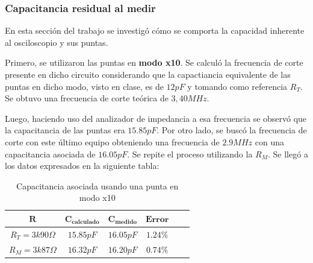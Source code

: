 \documentclass[11pt, a4paper]{article}
\begin{document}
\subsubsection*{Capacitancia residual al medir}

En esta sección del trabajo se investigó cómo se comporta la capacidad inherente al osciloscopio y sus puntas. 

Primero, se utilizaron las puntas en \textbf{modo x10}. Se calculó la frecuencia de corte presente en dicho circuito considerando que la capactiancia equivalente de las puntas en dicho modo, visto en clase, es de $12 pF$ y tomando como referencia $R_T$. Se obtuvo una frecuencia de corte teórica de $3,40MHz$. \par 
Luego, haciendo uso del analizador de impedancia a esa frecuencia se observó que la capacitancia de las puntas era $15.85 pF$. Por otro lado, se buscó la frecuencia de corte con este último equipo obteniendo una frecuencia de $2.9 MHz$ con una capacitancia asociada de $16.05pF$. Se repite el proceso utilizando la $R_M$. Se llegó a los datos expresados en la siguiente tabla:
 \begin{center}
     \begin{table}[ht]
     \centering
	 \renewcommand{\arraystretch}{1.1}
         \begin{tabular}{c c c c c c}
            \hline 
             $\bm{R}$ &  $\bm{C_{calculado}}$ &    $\bm{C_{medido}}$   &  $\bm{Error}$\\ \hline
             $R_T = 3k90\Omega$  & $15.85 pF$ & $16.05 pF$ & $1.24\%$ \\  
             $R_M = 3k87\Omega$ & $16.32 pF$ & $16.20 pF$ & $0.74 \%$ \\   \hline
        \end{tabular}
        \caption{Capacitancia asociada usando una punta en modo x10}
        \label{table:valores_punta_x10}
    \end{table}
\end{center}
\end{document}
